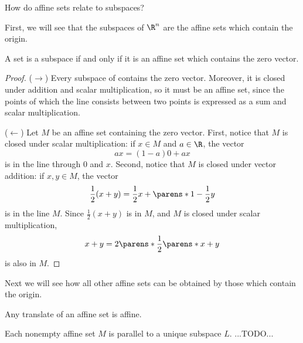 

How do affine sets relate to subspaces?


First, we will see that the subspaces of $\R^n$ are the affine sets which contain the origin.

\begin{prop}

A set is a subspace if and only if it is an affine set which contains the zero vector.

\begin{proof}

($\rightarrow$) Every subspace of contains the zero vector. Moreover, it is closed under addition and scalar multiplication, so it must be an affine set, since the points of which the line consists between two points is expressed as a sum and scalar multiplication.

($\leftarrow$) Let $M$ be an affine set containing the zero vector. First, notice that $M$ is closed under scalar multiplication: if $x \in M$ and $a \in \R$, the vector
$$
  ax = (1 - a)0 + ax
$$
is in the line through $0$ and $x$.
Second, notice that $M$ is closed under vector addition: if $x, y \in M$, the vector
$$
  \frac{1}{2}(x + y) = \frac{1}{2}x + \parens*{1 - \frac{1}{2}}y
$$
is in the line $M$.
  Since $\frac{1}{2}(x + y)$ is in $M$, and $M$ is closed under scalar multiplication,
$$
  x + y = 2\parens*{\frac{1}{2}\parens*{x + y}}
$$
is also in $M$.

\end{proof}

\end{prop}

Next we will see how all other affine sets can be obtained by those which contain the origin.


Any translate of an affine set is affine.

\begin{prop}

Each nonempty affine set $M$ is parallel to a unique subspace $L$. ...TODO...

\end{prop}
